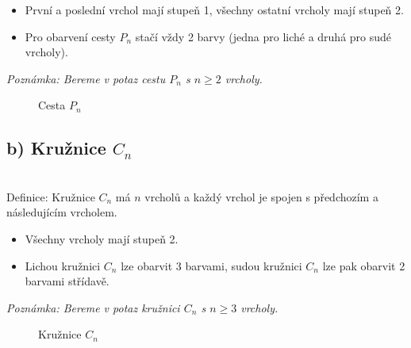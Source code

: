 \documentclass[10pt, a4paper]{ReportSheet}
\begin{document}
    \begin{itemize}
        \item První a poslední vrchol mají stupeň 1, všechny ostatní vrcholy mají stupeň 2.
        \item Pro obarvení cesty $P_n$ stačí vždy 2 barvy (jedna pro liché a druhá pro sudé vrcholy).
    \end{itemize}
    \textit{Poznámka: Bereme v potaz cestu $P_n$ s $n \geq 2$ vrcholy.}

    \begin{figure}[H]
        \centering
        \caption{Cesta $P_n$}
        \label{fig:ukol-2-1a-cesta}
    \end{figure}


    \subsection{b) Kružnice $C_n$}\\
    Definice: Kružnice $C_n$ má $n$ vrcholů a každý vrchol je spojen s předchozím a následujícím vrcholem.

    \begin{itemize}
        \item Všechny vrcholy mají stupeň 2.
        \item Lichou kružnici $C_n$ lze obarvit 3 barvami, sudou kružnici $C_n$ lze pak obarvit 2 barvami střídavě.
    \end{itemize}
    \textit{Poznámka: Bereme v potaz kružnici $C_n$ s $n \geq 3$ vrcholy.}

    \begin{figure}[H]
        \centering
        \caption{Kružnice $C_n$}
        \label{fig:ukol-2-1b-kruznice}
    \end{figure}
\end{document}
